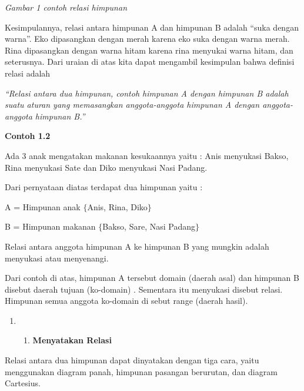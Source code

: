 \documentclass[11pt,fleqn]{book} %
\begin{document}
\noindent \textit{Gambar 1 contoh relasi himpunan}

\noindent 

\noindent Kesimpulannya, relasi antara himpunan A dan himpunan B adalah ``suka dengan warna''. Eko dipasangkan dengan merah karena eko suka dengan warna merah. Rina dipasangkan dengan warna hitam karena rina menyukai warna hitam, dan seterusnya. Dari uraian di atas kita dapat mengambil kesimpulan bahwa definisi relasi adalah

\noindent 

\noindent \textit{``Relasi antara dua himpunan, contoh himpunan A dengan himpunan B adalah suatu aturan yang memasangkan anggota-anggota himpunan A dengan anggota-anggota himpunan B.''}

\noindent 

\noindent 

\noindent \textbf{Contoh 1.2}

\noindent Ada 3 anak mengatakan makanan kesukaannya yaitu : Anis menyukasi Bakso, Rina menyukasi Sate dan Diko menyukasi Nasi Padang.

\noindent 

\noindent Dari pernyataan diatas terdapat dua himpunan yaitu :

\noindent A = Himpunan anak $\{$Anis, Rina, Diko$\}$

\noindent B = Himpunan makanan $\{$Bakso, Sare, Nasi Padang$\}$

\noindent 

\noindent Relasi antara anggota himpunan A ke himpunan B yang mungkin adalah menyukasi atau menyenangi.

\noindent Dari contoh di atas, himpunan A tersebut domain (daerah asal) dan himpunan B disebut daerah tujuan (ko-domain) . Sementara itu menyukasi disebut relasi. Himpunan semua anggota ko-domain di sebut range (daerah hasil).

\noindent 

\begin{enumerate}
\item \begin{enumerate}
\item  \textbf{Menyatakan Relasi}
\end{enumerate}
\end{enumerate}

\noindent 

Relasi antara dua himpunan dapat dinyatakan dengan tiga cara, yaitu menggunakan diagram panah, himpunan pasangan berurutan, dan diagram Cartesius.
\end{document}
